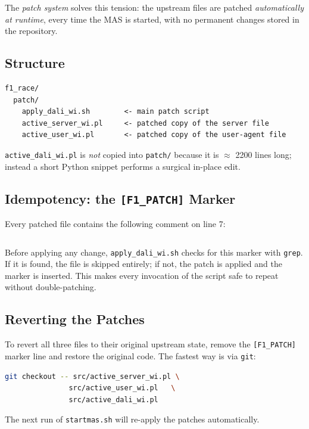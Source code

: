 \noindent
The \emph{patch system} solves this tension: the upstream files are patched
\emph{automatically at runtime}, every time the MAS is started, with no
permanent changes stored in the repository.

\subsection{Structure}

\begin{lstlisting}[style=tree, numbers=none, basicstyle=\ttfamily\footnotesize]
f1_race/
  patch/
    apply_dali_wi.sh        <- main patch script
    active_server_wi.pl     <- patched copy of the server file
    active_user_wi.pl       <- patched copy of the user-agent file
\end{lstlisting}

\noindent
\texttt{active\_dali\_wi.pl} is \emph{not} copied into \texttt{patch/}
because it is $\approx$ 2200 lines long; instead a short Python snippet
performs a surgical in-place edit.

\subsection{Idempotency: the \texttt{[F1\_PATCH]} Marker}

Every patched file contains the following comment on line 7:

\begin{lstlisting}[language=Prolog, numbers=none]
% [F1_PATCH] read server address from server.txt (dynamic port support)
\end{lstlisting}

\noindent
Before applying any change, \texttt{apply\_dali\_wi.sh} checks for this
marker with \texttt{grep}. If it is found, the file is skipped entirely; if
not, the patch is applied and the marker is inserted. This makes every
invocation of the script safe to repeat without double-patching.

\subsection{Reverting the Patches}

To revert all three files to their original upstream state, remove the
\texttt{[F1\_PATCH]} marker line and restore the original code. The fastest
way is via \texttt{git}:

\begin{lstlisting}[language=bash, numbers=none]
git checkout -- src/active_server_wi.pl \
               src/active_user_wi.pl   \
               src/active_dali_wi.pl
\end{lstlisting}

\noindent
The next run of \texttt{startmas.sh} will re-apply the patches automatically.
